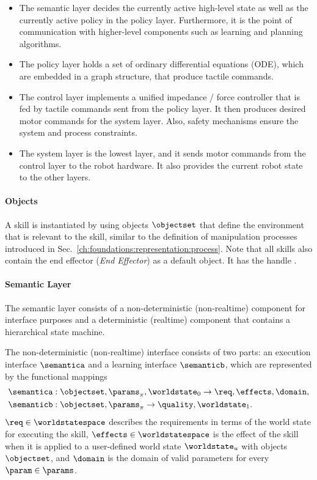 \begin{itemize}
\item The semantic layer decides the currently active high-level state as well as the currently active policy in the policy layer.
Furthermore, it is the point of communication with higher-level components such as learning and planning algorithms.
\item The policy layer holds a set of ordinary differential equations (ODE), which are embedded in a graph structure, that produce tactile commands.
\item The control layer implements a unified impedance / force controller that is fed by tactile commands sent from the policy layer.
It then produces desired motor commands for the system layer. Also, safety mechanisms ensure the system and process constraints.
\item The system layer is the lowest layer, and it sends motor commands from the control layer to the robot hardware.
It also provides the current robot state to the other layers.
\end{itemize}

\paragraph{Objects}
A skill is instantiated by using objects $\objectset$ that define the environment that is relevant to the skill, similar to the definition of manipulation processes introduced in Sec.~\ref{ch:foundations:representation:process}.
Note that all skills also contain the end effector (\textit{End Effector}) as a default object.
It has the handle \sendeffector.

\paragraph{Semantic Layer}
The semantic layer consists of a non-deterministic (non-realtime) component for interface purposes and a deterministic (realtime) component that contains a hierarchical state machine.

The non-deterministic (non-realtime) interface consists of two parts: an execution interface $\semantica$ and a learning interface $\semanticb$, which are represented by the functional mappings
\begin{align*}
&\semantica:\objectset,\params_\pi,\worldstate_0 \rightarrow \req,\effects,\domain, \\
&\semanticb:\objectset,\params_\pi \rightarrow \quality,\worldstate_1.
\end{align*}
$\req \in \worldstatespace$ describes the requirements in terms of the world state for executing the skill, $\effects \in \worldstatespace$ is the effect of the skill when it is applied to a user-defined world state $\worldstate_u$ with objects $\objectset$, and $\domain$ is the domain of valid parameters for every $\param \in \params$.

